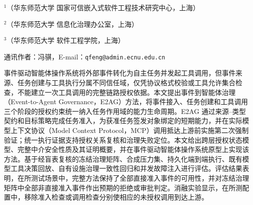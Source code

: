 \thispagestyle{josfirst}


\vspace{7pt}

\vspace{4pt}
\begingroup\fontsize{8pt}{12pt}\selectfont
\noindent$^{1}$（华东师范大学 国家可信嵌入式软件工程技术研究中心，上海）\par
\noindent$^{2}$（华东师范大学 信息化治理办公室，上海）\par
\noindent$^{3}$（华东师范大学 软件工程学院，上海）\par
\noindent 通讯作者：冯骐，E-mail：\texttt{qfeng@admin.ecnu.edu.cn}\par
\endgroup

\begin{joszhabstract}
事件驱动智能体操作系统将外部事件转化为自主任务并发起工具调用，但事件来源、任务创建与工具执行分属不同信任域，仅凭协议格式校验或工具允许集合检查，不能建立一次工具调用的完整链路授权依据。本文提出事件到智能体治理（Event-to-Agent Governance，E2AG）方法，将事件接入、任务创建和工具调用三个阶段的授权约束统一纳入任务作用域的能力生命周期。E2AG 通过来源--类型契约和目标策略完成任务准入，为获准任务签发对象绑定的短期能力，并在实际模型上下文协议（Model Context Protocol，MCP）调用抵达上游前实施第二次强制验证；统一执行证据支持授权关系复核和治理失败定位。本文给出跨层授权状态模型、完整中介安全性质及其证明概要，并在事件驱动智能体操作系统原型上实现该方法。基于经盲表复核的冻结治理矩阵、合成压力集、持久化端到端执行、既有模型工具决策回放、自有设施治理一致性回归和并发故障注入进行评估。评估结果表明，在所测试场景中，完整方法保持了全部直接准入事件的可用性，并对冻结治理矩阵中全部非直接准入事件作出预期的拒绝或审批判定。消融实验显示，在所测配置中，移除准入检查或调用检查分别使相应的未授权调用到达上游。
\end{joszhabstract}

